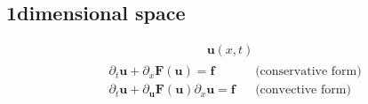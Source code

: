 \documentclass[letterpaper,10pt,english]{jupyterBook}
\begin{document}
\subsection{1\sphinxhyphen{}dimensional space}
\label{\detokenize{ch/pde/hyperbolic:dimensional-space}}\begin{equation*}
\begin{split}\mathbf{u}(x,t)\end{split}
\end{equation*}\begin{equation*}
\begin{split}\begin{aligned}
  & \partial_t \mathbf{u} + \partial_x \mathbf{F}(\mathbf{u}) = \mathbf{f}  && \text{(conservative form)} \\
  & \partial_t \mathbf{u} + \partial_{\mathbf{u}} \mathbf{F}(\mathbf{u}) \partial_x \mathbf{u} = \mathbf{f}  && \text{(convective form)} \\
\end{aligned}\end{split}
\end{equation*}
\end{document}

